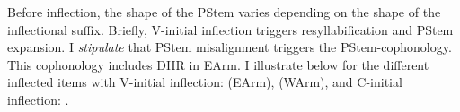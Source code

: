\label{nlttPapersection: reduction: destressed reduction EA: pstem: apply: infl}

Before inflection, the shape of the PStem varies depending on the shape of the inflectional suffix. Briefly, V-initial inflection triggers resyllabification and PStem expansion. I \textit{stipulate} that PStem misalignment triggers the PStem-cophonology. This cophonology includes DHR in EArm. I illustrate below for the different inflected items with V-initial inflection: \textit{} (EArm), \textit{} (WArm), and C-initial inflection: \textit{}. %

















